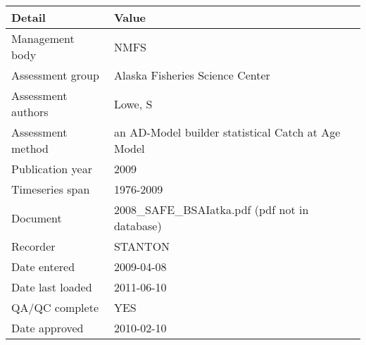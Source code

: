 \begin{table}[htb]
\centering
\begin{tabular}{lp{7cm}}
\toprule
Detail & Value \\
\midrule
Management body    & NMFS                                               \\
Assessment group   & Alaska Fisheries Science Center                    \\
Assessment authors & Lowe, S                                            \\
Assessment method  & an AD-Model builder statistical Catch at Age Model \\
Publication year   & 2009                                               \\
Timeseries span    & 1976-2009                                          \\
Document           & 2008\_SAFE\_BSAIatka.pdf (pdf not in database)     \\
Recorder           & STANTON                                            \\
Date entered       & 2009-04-08                                         \\
Date last loaded   & 2011-06-10                                         \\
QA/QC complete     & YES                                                \\
Date approved      & 2010-02-10                                         \\
\bottomrule
\end{tabular}
\label{tab:assessdet}
\end{table}
